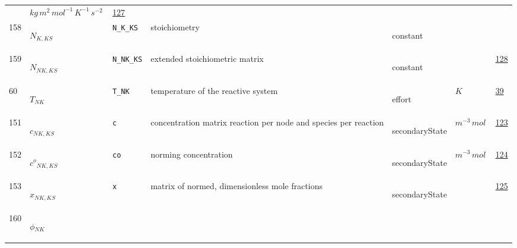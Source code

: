 \begin{longtable}{|p{1cm}|p{2.5cm}|p{4.5cm}|p{8cm}|p{3.0cm}|p{3cm}|p{1cm}|}
             & $ kg \,m^{2} \,mol^{-1} \,K^{-1} \,s^{-2} \, $
             & \hyperlink{"e:127"}{ 127 }
                 \\
    158
             & \hypertarget{"v:158"}{ $ {N}{_{K, {K S}}} $}
             & \verb|N_K_KS|
             & stoichiometry
             & \begin{lay}constant \end{lay}
             & $  $
             & \\
    159
             & \hypertarget{"v:159"}{ $ {N}{_{{N K}, {K S}}} $}
             & \verb|N_NK_KS|
             & extended stoichiometric matrix
             & \begin{lay}constant \end{lay}
             & $  $
             & \hyperlink{"e:128"}{ 128 }
                 \\
    60
             & \hypertarget{"v:60"}{ $ {T}{_{{N K}}} $}
             & \verb|T_NK|
             & temperature of the reactive system
             & \begin{lay}effort \end{lay}
             & $ K \, $
             & \hyperlink{"e:39"}{ 39 }
                 \\
    151
             & \hypertarget{"v:151"}{ $ {c}{_{{N K}, {K S}}} $}
             & \verb|c|
             & concentration matrix reaction per node and species per reaction
             & \begin{lay}secondaryState \end{lay}
             & $ m^{-3} \,mol \, $
             & \hyperlink{"e:123"}{ 123 }
                 \\
    152
             & \hypertarget{"v:152"}{ $ {{c^o}}{_{{N K}, {K S}}} $}
             & \verb|co|
             & norming concentration
             & \begin{lay}secondaryState \end{lay}
             & $ m^{-3} \,mol \, $
             & \hyperlink{"e:124"}{ 124 }
                 \\
    153
             & \hypertarget{"v:153"}{ $ {x}{_{{N K}, {K S}}} $}
             & \verb|x|
             & matrix of normed, dimensionless mole fractions 
             & \begin{lay}secondaryState \end{lay}
             & $  $
             & \hyperlink{"e:125"}{ 125 }
                 \\
    160
             & \hypertarget{"v:160"}{ $ {\phi}{_{{N K}}} $}

\end{longtable}
